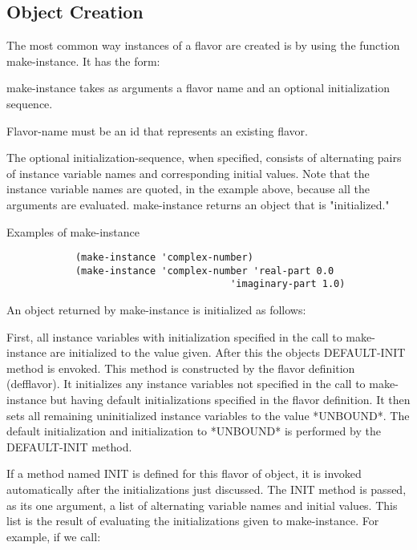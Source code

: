 \subsection{Object Creation}

  The most common way instances of a flavor are  created  is  by
using the function make-instance.  It has the form:


{
    make-instance  takes  as  arguments  a  flavor  name  and an
    optional initialization sequence.

    Flavor-name must  be  an  id  that  represents  an  existing
    flavor.

    The   optional   initialization-sequence,   when  specified,
    consists of alternating pairs of instance variable names and
    corresponding  initial  values.   Note  that  the   instance
    variable names are quoted, in the example above, because all
    the arguments are evaluated. make-instance returns an object
    that is "initialized."
}

  Examples of make-instance

\begin{verbatim}
            (make-instance 'complex-number)
            (make-instance 'complex-number 'real-part 0.0 
	                                   'imaginary-part 1.0)
\end{verbatim}
  An object returned by make-instance is initialized as follows:

  First, all instance variables with initialization specified in
the  call  to  make-instance are initialized to the value given.
After this the objects DEFAULT-INIT  method  is  envoked. This
method  is constructed by the flavor definition (defflavor).
It initializes any instance variables not specified in the 
call to make-instance but having default initializations 
specified in the flavor definition. It then sets all remaining
uninitialized instance variables to the value *UNBOUND*. The 
default initialization and initialization to *UNBOUND* is 
performed by the DEFAULT-INIT method.

  If a method named INIT is defined for this flavor  of  object,
it  is  invoked  automatically  after  the  initializations just
discussed.  The INIT method is passed, as its  one  argument,  a
list  of  alternating  variable  names and initial values.  This
list is the result of evaluating the  initializations  given  to
make-instance.  For example, if we call:

